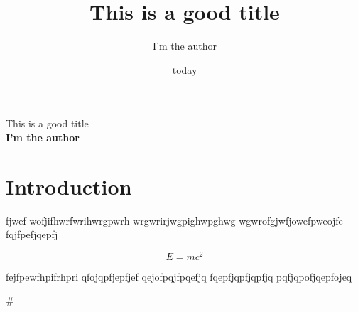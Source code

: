 \documentclass[12pt]{article}
\title{This is a good title}
\author{I'm the author}
\date{today}
\begin{document}
\begin{center}
\Large{This is a good title}
\\
\textbf{I'm the author}
\end{center}

\tableofcontents

\section{Introduction}

fjwef
wofjifhwrfwrihwrgpwrh
wrgwrirjwgpighwpghwg
wgwrofgjwfjowefpweojfe
fqjfpefjqepfj

$$ 
E = mc^{2}
$$

fejfpewfhpifrhpri
qfojqpfjepfjef
qejofpqjfpqefjq
fqepfjqpfjqpfjq
pqfjqpofjqepfojeq

#
\end{document}
